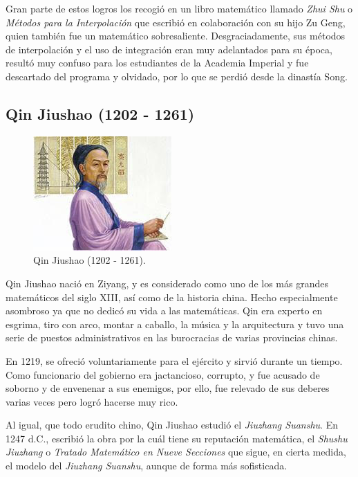 \documentclass[a4paper, 11pt]{article}
\begin{document}
		Gran parte de estos logros los recogió en un libro matemático llamado \textit{Zhui Shu} o \textit{Métodos para la
		Interpolación} que escribió en colaboración con su hijo Zu Geng, quien también fue un matemático sobresaliente.
		Desgraciadamente, sus métodos de interpolación y el uso de integración eran muy adelantados para su época, resultó
		muy confuso para los estudiantes de la Academia Imperial y fue descartado del programa y olvidado, por lo que se
		perdió desde la dinastía Song.
	
	\subsection{Qin Jiushao (1202 - 1261)}
		\begin{figure}[!ht]
			\centering
			\includegraphics{qin_jiushao.jpg}
			\caption{Qin Jiushao (1202 - 1261).}
			\label{fig:qin_jiushao}
		\end{figure}

		Qin Jiushao nació en Ziyang, y es considerado como uno de los más grandes matemáticos del siglo XIII, así como
		de la historia china. Hecho especialmente asombroso ya que no dedicó su vida a las matemáticas. Qin era experto
		en esgrima, tiro con arco, montar a caballo, la música y la arquitectura y tuvo una serie de puestos administrativos
		en las burocracias de varias provincias chinas.
		
		En 1219, se ofreció voluntariamente para el ejército y sirvió durante un tiempo. Como funcionario del gobierno
		era jactancioso, corrupto, y fue acusado de soborno y de envenenar a sus enemigos, por ello, fue relevado de sus
		deberes varias veces pero logró hacerse muy rico.
		
		Al igual, que todo erudito chino, Qin Jiushao estudió el \textit{Jiuzhang Suanshu}. En 1247 d.C., escribió la
		obra por la cuál tiene su reputación matemática, el \textit{Shushu Jiuzhang} o \textit{Tratado Matemático en Nueve
		Secciones} que sigue, en cierta medida, el modelo del \textit{Jiuzhang Suanshu}, aunque de forma más sofisticada.
		
\end{document}
